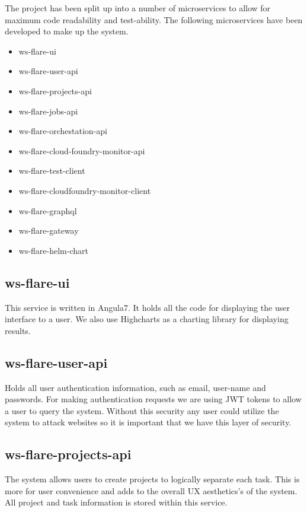 The project has been split up into a number of microservices to allow for maximum code readability and test-ability. The following microservices have been developed to make up the system.

\begin{itemize}
  \item ws-flare-ui
  \item ws-flare-user-api
  \item ws-flare-projects-api
  \item ws-flare-jobs-api
  \item ws-flare-orchestation-api
  \item ws-flare-cloud-foundry-monitor-api
  \item ws-flare-test-client
  \item ws-flare-cloudfoundry-monitor-client
  \item ws-flare-graphql
  \item ws-flare-gateway
  \item ws-flare-helm-chart
\end{itemize}

\subsection{ws-flare-ui}

This service is written in Angula7. It holds all the code for displaying the user interface to a user. We also use Highcharts as a charting library for displaying results.

\subsection{ws-flare-user-api}

Holds all user authentication information, such as email, user-name and passwords. For making authentication requests we are using JWT tokens to allow a user to query the system. Without this security any user could utilize the system to attack websites so it is important that we have this layer of security.

\subsection{ws-flare-projects-api}

The system allows users to create projects to logically separate each task. This is more for user convenience and adds to the overall UX aesthetics's of the system. All project and task information is stored within this service. 

